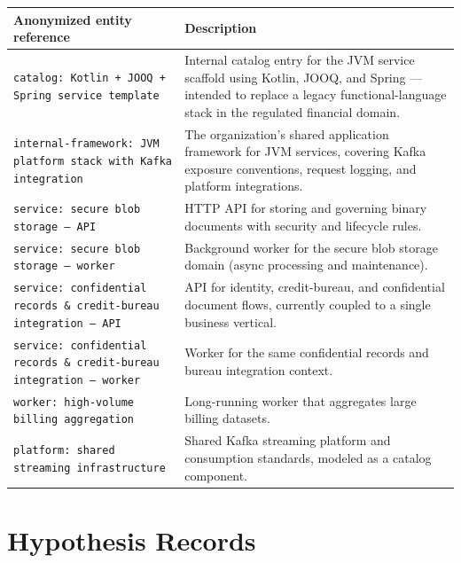 \noindent\begin{minipage}{\linewidth}
\centering\small
\setlength{\tabcolsep}{5pt}
\begin{tabular}{p{5.2cm}p{7.8cm}}
\toprule
\textbf{Anonymized entity reference} & \textbf{Description} \\
\midrule
\texttt{catalog: Kotlin + JOOQ + Spring service template}
  & Internal catalog entry for the JVM service scaffold using Kotlin, JOOQ, and
    Spring — intended to replace a legacy functional-language stack in the
    regulated financial domain. \\[4pt]
\texttt{internal-framework: JVM platform stack with Kafka integration}
  & The organization's shared application framework for JVM services, covering
    Kafka exposure conventions, request logging, and platform integrations. \\[4pt]
\texttt{service: secure blob storage — API}
  & HTTP API for storing and governing binary documents with security and
    lifecycle rules. \\[4pt]
\texttt{service: secure blob storage — worker}
  & Background worker for the secure blob storage domain (async processing and
    maintenance). \\[4pt]
\texttt{service: confidential records \& credit-bureau integration — API}
  & API for identity, credit-bureau, and confidential document flows, currently
    coupled to a single business vertical. \\[4pt]
\texttt{service: confidential records \& credit-bureau integration — worker}
  & Worker for the same confidential records and bureau integration context. \\[4pt]
\texttt{worker: high-volume billing aggregation}
  & Long-running worker that aggregates large billing datasets. \\[4pt]
\texttt{platform: shared streaming infrastructure}
  & Shared Kafka streaming platform and consumption standards, modeled as a
    catalog component. \\
\bottomrule
\end{tabular}
\label{tab:entity-legend}
\end{minipage}
\par\bigskip

\section{Hypothesis Records}
\label{sec:app-hypothesis-records}

